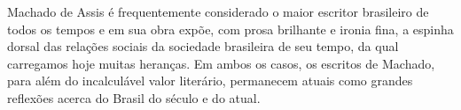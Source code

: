 Machado de Assis é frequentemente considerado o maior escritor brasileiro de todos os tempos e em sua obra expõe, com prosa brilhante e ironia fina, a espinha dorsal das relações sociais da sociedade brasileira de seu tempo, da qual carregamos hoje muitas heranças. Em ambos os casos, os escritos de Machado, para além do incalculável valor literário, permanecem atuais como grandes reflexões acerca do Brasil do século  e do atual.


\vfill

\hspace*{-.4cm}\begin{minipage}[c]{.5\linewidth}
\small{
{}}
\end{minipage}

\pagebreak

